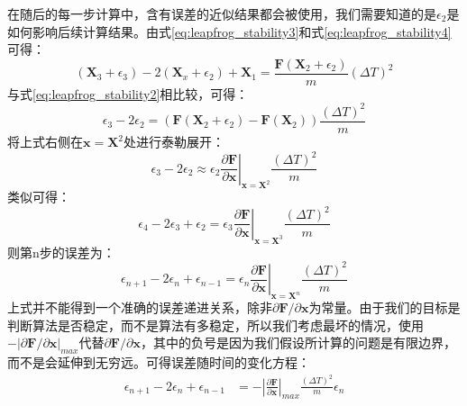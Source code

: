 {在随后的每一步计算中，含有误差的近似结果都会被使用，我们需要知道的是${\epsilon}_2$是如何影响后续计算结果。由式\ref{eq:leapfrog_stability3}和式\ref{eq:leapfrog_stability4}可得：
      \begin{equation}
         \label{eq:leapfrog_stabilit6}
         (\mathbf{X}_{3}+{\epsilon}_3)-2(\mathbf{X}_{x}+{\epsilon}_2)+\mathbf{X}_{1} = \frac{\mathbf{F}(\mathbf{X}_2+{\epsilon}_2)}{m} {(\Delta T)^2}
      \end{equation}
与式\ref{eq:leapfrog_stability2}相比较，可得：
      \begin{equation}
         \label{eq:leapfrog_stabilit7}
         {\epsilon}_3-2{\epsilon}_2 = \left(\mathbf{F}(\mathbf{X}_2+{\epsilon}_2)  -\mathbf{F}(\mathbf{X}_2) \right)\frac{{(\Delta T)^2}}{m}
      \end{equation}
将上式右侧在$\mathbf{x}=\mathbf{X}^2$处进行泰勒展开：
      \begin{equation}
         \label{eq:leapfrog_stabilit8}
         {\epsilon}_3-2{\epsilon}_2 \approx {\epsilon}_2\left. \frac{\partial\mathbf{F}}{\partial\mathbf{x}}\right|_{\mathbf{x}=\mathbf{X}^2} \frac{{(\Delta T)^2}}{m}
      \end{equation}
类似可得：
      \begin{equation}
         \label{eq:leapfrog_stabilit9}
         {\epsilon}_4-2{\epsilon}_3+{\epsilon}_2 = {\epsilon}_3\left. \frac{\partial\mathbf{F}}{\partial\mathbf{x}}\right|_{\mathbf{x}=\mathbf{X}^3} \frac{{(\Delta T)^2}}{m}
      \end{equation}
则第n步的误差为：
      \begin{equation}
         \label{eq:leapfrog_stabilit10}
         {\epsilon}_{n+1}-2{\epsilon}_n+{\epsilon}_{n-1} = {\epsilon}_n \left. \frac{\partial\mathbf{F}}{\partial\mathbf{x}}\right|_{\mathbf{x}=\mathbf{X}^n} \frac{{(\Delta T)^2}}{m}
      \end{equation}
上式并不能得到一个准确的误差递进关系，除非${\partial\mathbf{F}}/{\partial\mathbf{x}}$为常量。由于我们的目标是判断算法是否稳定，而不是算法有多稳定，所以我们考虑最坏的情况，使用$-|{\partial\mathbf{F}}/{\partial\mathbf{x}}|_{max}$代替${\partial\mathbf{F}}/{\partial\mathbf{x}}$，其中的负号是因为我们假设所计算的问题是有限边界，而不是会延伸到无穷远。可得误差随时间的变化方程：
      \begin{align}
         \label{eq:leapfrog_stabilit11}
         {\epsilon}_{n+1}-2{\epsilon}_n+{\epsilon}_{n-1} &= -\left| \frac{\partial\mathbf{F}}{\partial\mathbf{x}}\right|_{max} \frac{{(\Delta T)^2}}{m} {\epsilon}_n \\

\end{align}}
